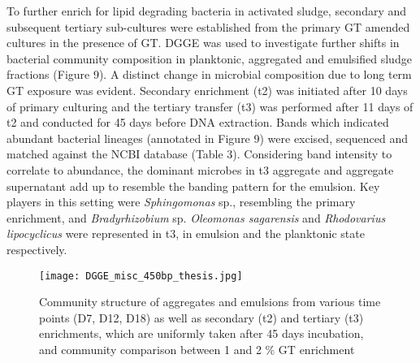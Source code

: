 \documentclass[twoside]{article}
\begin{document}
To further enrich for lipid degrading bacteria in activated sludge, secondary and subsequent tertiary sub-cultures were established from the primary GT amended cultures in the presence of GT. DGGE was used to investigate further shifts in bacterial community composition in planktonic, aggregated and emulsified sludge fractions (Figure 9). 
A distinct change in microbial composition due to long term GT exposure was evident. Secondary enrichment (t2) was initiated after 10 days of primary culturing and the tertiary transfer (t3) was performed after 11 days of t2 and conducted for 45 days before DNA extraction. Bands which indicated abundant bacterial lineages (annotated in Figure 9) were excised, sequenced and matched against the NCBI database (Table 3). 
Considering band intensity to correlate to abundance, the dominant microbes in t3 aggregate and aggregate supernatant add up to resemble the banding pattern for the emulsion. 
Key players in this setting were \emph{Sphingomonas} sp., resembling the primary enrichment, and \emph{Bradyrhizobium} sp. \emph{Oleomonas sagarensis} and \emph{Rhodovarius lipocyclicus} were represented in t3, in emulsion and the planktonic state respectively.

\begin{figure}
\texttt{[image: DGGE\_misc\_450bp\_thesis.jpg]}
\caption{Community structure of aggregates and emulsions from various time points (D7, D12, D18) as well as secondary (t2) and tertiary (t3) enrichments, which are uniformly taken after 45 days incubation, and community comparison between 1 and 2 \% GT enrichment}
\end{figure}
\end{document}
